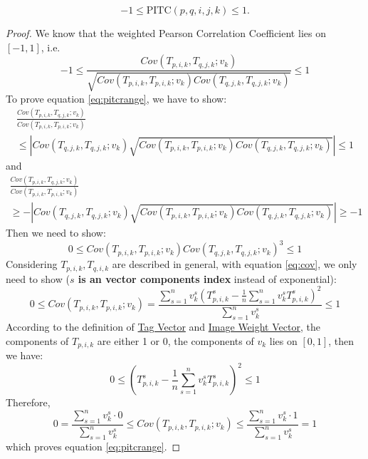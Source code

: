 \begin{lemma}
\label{lemma:pitcrange}
\begin{equation}
\label{eq:pitcrange}
-1 \leq \text{PITC}(p, q, i, j, k) \leq 1.
\end{equation}
\end{lemma}
\begin{proof}
We know that the weighted Pearson Correlation Coefficient \cite{wiki:PearsonCorrelationCoefficient} lies on $[-1, 1]$, i.e.
\[
  -1 \leq \frac{Cov(T_{p,i,k}, T_{q,j,k}; v_k)}{\sqrt{Cov(T_{p,i,k}, T_{p,i,k}; v_k)Cov(T_{q,j,k}, T_{q,j,k}; v_k)}} \leq 1
\]
To prove equation \ref{eq:pitcrange}, we have to show:
\begin{multline}
  \frac{Cov(T_{p,i,k}, T_{q,j,k}; v_k)}{Cov(T_{p,i,k}, T_{p,i,k}; v_k)} \\
  \leq |Cov(T_{q,j,k}, T_{q,j,k}; v_k)\sqrt{Cov(T_{p,i,k}, T_{p,i,k}; v_k)Cov(T_{q,j,k}, T_{q,j,k}; v_k)}| \leq 1
\end{multline}
and
\begin{multline}
  \frac{Cov(T_{p,i,k}, T_{q,j,k}; v_k)}{Cov(T_{p,i,k}, T_{p,i,k}; v_k)} \\
  \geq -|Cov(T_{q,j,k}, T_{q,j,k}; v_k)\sqrt{Cov(T_{p,i,k}, T_{p,i,k}; v_k)Cov(T_{q,j,k}, T_{q,j,k}; v_k)}| \geq -1
\end{multline}
Then we need to show:
\begin{equation}
0 \leq Cov(T_{p,i,k}, T_{p,i,k}; v_k)Cov(T_{q,j,k}, T_{q,j,k}; v_k)^3 \leq 1
\end{equation}
Considering $T_{p,i,k}, T_{q,i,k}$ are described in general, with equation \ref{eq:cov}, 
we only need to show (\textbf{$s$ is an vector components index} instead of exponential):
\begin{equation}
0 \leq Cov(T_{p,i,k}, T_{p,i,k}; v_k) = 
\frac{
  \sum_{s=1}^{n}{
    v_{k}^s
    \left(T_{p,i,k}^s - \frac{1}{n}\sum_{s=1}^{n}{v_{k}^s T_{p,i,k}^s}\right)^2
  }
}{
  \sum_{s=1}^{n}{v_{k}^s}
} \leq 1
\end{equation}
According to the definition of \hyperref[def:tagv]{Tag Vector} and \hyperref[def:weightvk]{Image Weight Vector},
the components of $T_{p,i,k}$ are either 1 or 0, 
the components of $v_k$ lies on $[0, 1]$, then we have:
\begin{equation}
0 \leq \left(T_{p,i,k}^s - \frac{1}{n}\sum_{s=1}^{n}{v_{k}^s T_{p,i,k}^s}\right)^2 \leq 1
\end{equation}
Therefore,
\begin{equation}
0 = \frac{
  \sum_{s=1}^{n}{
    v_{k}^s \cdot 0
  }
}{
  \sum_{s=1}^{n}{v_{k}^s}
} 
\leq Cov(T_{p,i,k}, T_{p,i,k}; v_k) \leq
\frac{
  \sum_{s=1}^{n}{
    v_{k}^s \cdot 1
  }
}{
  \sum_{s=1}^{n}{v_{k}^s}
} = 1
\end{equation}
which proves equation \ref{eq:pitcrange}.
\end{proof}

